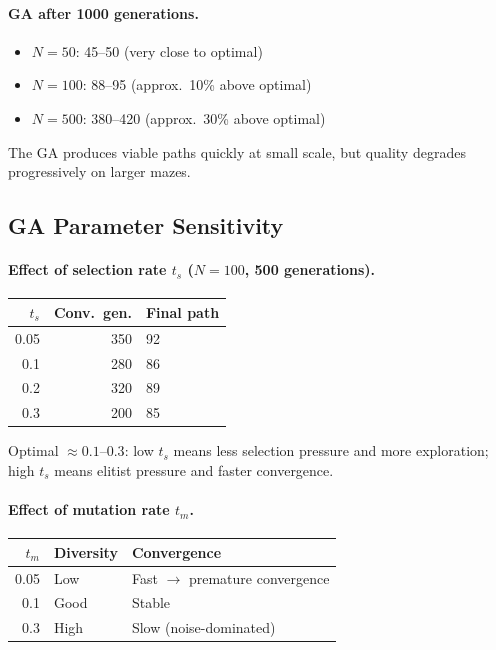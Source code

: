 \documentclass[12pt, a4paper]{article}
\theoremstyle{definition}
\begin{document}
\paragraph{GA after 1000 generations.}
\begin{itemize}[noitemsep]
    \item $N=50$: 45--50 (very close to optimal)
    \item $N=100$: 88--95 (approx.\ 10\% above optimal)
    \item $N=500$: 380--420 (approx.\ 30\% above optimal)
\end{itemize}

The GA produces viable paths quickly at small scale, but quality degrades
progressively on larger mazes.

\subsection{GA Parameter Sensitivity}

\paragraph{Effect of selection rate $t_s$ ($N=100$, 500 generations).}

\begin{center}
\begin{tabular}{rrl}
    \toprule
    $t_s$ & Conv.\ gen. & Final path \\
    \midrule
    0.05 & 350 & 92 \\
    0.1  & 280 & 86 \\
    0.2  & 320 & 89 \\
    0.3  & 200 & 85 \\
    \bottomrule
\end{tabular}
\end{center}

Optimal $\approx 0.1$--$0.3$: low $t_s$ means less selection pressure and more
exploration; high $t_s$ means elitist pressure and faster convergence.

\paragraph{Effect of mutation rate $t_m$.}

\begin{center}
\begin{tabular}{rll}
    \toprule
    $t_m$ & Diversity & Convergence \\
    \midrule
    0.05 & Low  & Fast $\to$ premature convergence \\
    0.1  & Good & Stable \\
    0.3  & High & Slow (noise-dominated) \\
    \bottomrule
\end{tabular}
\end{center}
\end{document}
